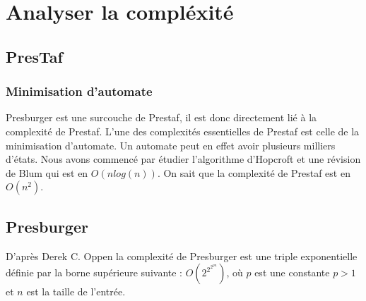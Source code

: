 \section{Analyser la compléxité}

\subsection{PresTaf}

\subsubsection{Minimisation d'automate}

Presburger est une surcouche de Prestaf, il est donc directement lié à la complexité de Prestaf. L'une des complexités essentielles de Prestaf est celle de la minimisation d'automate. Un automate peut en effet avoir plusieurs milliers d'états. Nous avons commencé par étudier l'algorithme d'Hopcroft et une révision de Blum qui est en $O(nlog(n))$. On sait que la complexité de Prestaf est en $O(n^2)$.

\subsection{Presburger}

D'après Derek C. Oppen\cite{oppen1978222pn} la complexité de Presburger est une triple exponentielle définie par la borne supérieure suivante : $O(2^{2^{2^{pn}}})$, où $p$ est une constante $p > 1$ et $n$ est la taille de l'entrée.
